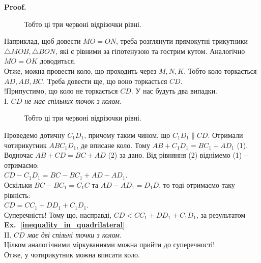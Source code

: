 \documentclass[a4paper, 10pt]{article}
\makeatletter
\theoremstyle{theoremdd}
\theoremstyle{theoremdd}
\theoremstyle{theoremdd}
\theoremstyle{theoremdd}
\theoremstyle{theoremdd}
\theoremstyle{theoremdd}
\theoremstyle{theoremdd}
\theoremstyle{theoremdd}
\theoremstyle{theoremdd}
\newcommand\exref[1]{\textbf{Ex.~\ref{#1}}}
\renewenvironment{proof}[1][Proof.\\]{\par
\pushQED{\hfill \qed}%
\normalfont \topsep6\p@\@plus6\p@\relax
\trivlist
\item\relax
{\bfseries
#1\@addpunct{.}}\hspace\labelsep\ignorespaces
}{%
\popQED\endtrivlist\@endpefalse
}
\makeatother
\begin{document}
\begin{proof}
\begin{figure}[H]
\caption*{Тобто ці три червоні відрізочки рівні.}
\end{figure}
Наприклад, щоб довести $MO = ON$, треба розглянути прямокутні трикутники $\triangle MOB, \triangle BON$, які є рівними за гіпотенузою та гострим кутом. Аналогічно $MO = OK$ доводиться.\\
Отже, можна провести коло, що проходить через $M,N,K$. Тобто коло торкається $AD,AB,BC$. Треба довести ще, що воно торкається $CD$.\\
!Припустимо, що коло не торкається $CD$. У нас будуть два випадки.\\
I. \textit{$CD$ не має спільних точок з колом}.\\
\begin{figure}[H]
\centering
{}
\caption*{Тобто ці три червоні відрізочки рівні.}
\end{figure}
Проведемо дотичну $C_1D_1$, причому таким чином, що $C_1 D_1 \parallel CD$. Отримали чотирикутник $ABC_1D_1$, де вписане коло. Тому $AB + C_1D_1 = BC_1 + AD_1$ (1). Водночас $AB + CD = BC + AD$ (2) за дано. Від рівняння (2) віднімемо (1) -- отримаємо:\\
$CD - C_1D_1 = BC - BC_1 + AD - AD_1$.\\
Оскільки $BC - BC_1 = C_1C$ та $AD - AD_1 = D_1D$, то тоді отримаємо таку рівність:\\
$CD = CC_1 + DD_1 + C_1D_1$.\\
Суперечність! Тому що, насправді, $CD < CC_1 + DD_1 + C_1D_1$, за результатом \exref{inequality_in_quadrilateral}.
\bigskip \\
II. \textit{$CD$ має дві спільні точки з колом}.\\
Цілком аналогічними міркуваннями можна прийти до суперечності!\\
Отже, у чотирикутник можна вписати коло.
\end{proof}
\newpage
\end{document}
